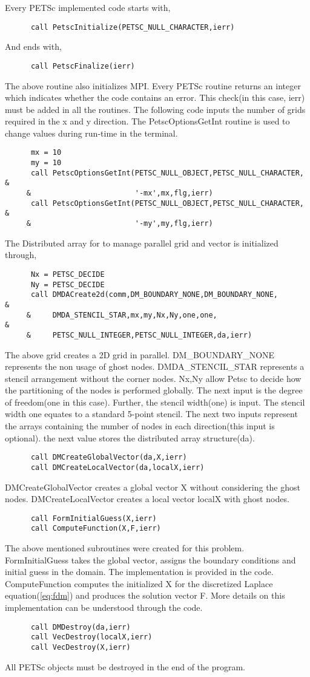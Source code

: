 Every PETSc implemented code starts with,
\begin{lstlisting}
      call PetscInitialize(PETSC_NULL_CHARACTER,ierr)
\end{lstlisting}
And ends with,
\begin{lstlisting}
      call PetscFinalize(ierr)
\end{lstlisting}
The above routine also initializes MPI. Every PETSc routine returns an integer which indicates whether the code contains an error. This check(in this case, ierr) must be added in all the routines. 
\newpage
The following code inputs the number of grids required in the x and y direction. The PetscOptionsGetInt routine is used to change values during run-time in the terminal. 
\begin{lstlisting}
      mx = 10
      my = 10
      call PetscOptionsGetInt(PETSC_NULL_OBJECT,PETSC_NULL_CHARACTER,    &
     &                        '-mx',mx,flg,ierr)
      call PetscOptionsGetInt(PETSC_NULL_OBJECT,PETSC_NULL_CHARACTER,    &
     &                        '-my',my,flg,ierr)
\end{lstlisting}
The Distributed array for to manage parallel grid and vector is initialized through,
\begin{lstlisting}
      Nx = PETSC_DECIDE
      Ny = PETSC_DECIDE
      call DMDACreate2d(comm,DM_BOUNDARY_NONE,DM_BOUNDARY_NONE,         &
     &     DMDA_STENCIL_STAR,mx,my,Nx,Ny,one,one,                        &
     &     PETSC_NULL_INTEGER,PETSC_NULL_INTEGER,da,ierr)
\end{lstlisting}
The above grid creates a 2D grid in parallel. DM\_BOUNDARY\_NONE represents the non usage of ghost nodes. DMDA\_STENCIL\_STAR represents a stencil arrangement without the corner nodes. Nx,Ny allow Petsc to decide how the partitioning of the nodes is performed globally. The next input is the degree of freedom(one in this case). Further, the stencil width(one) is input. The stencil width one equates to a standard 5-point stencil. The next two inputs represent the arrays containing the number of nodes in each direction(this input is optional). the next value stores the distributed array structure(da).
\begin{lstlisting}
      call DMCreateGlobalVector(da,X,ierr)
      call DMCreateLocalVector(da,localX,ierr)
\end{lstlisting}
DMCreateGlobalVector creates a global vector X without considering the ghost nodes. DMCreateLocalVector creates a local vector localX with ghost nodes.
\begin{lstlisting}
      call FormInitialGuess(X,ierr)
      call ComputeFunction(X,F,ierr)
\end{lstlisting}
The above mentioned subroutines were created for this problem. FormInitialGuess takes the global vector, assigns the boundary conditions and initial guess in the domain. The implementation is provided in the code. ComputeFunction computes the initialized X for the discretized Laplace equation(\ref{eq:fdm}) and produces the solution vector F. More details on this implementation can be understood through the code. 

\begin{lstlisting}
      call DMDestroy(da,ierr)
      call VecDestroy(localX,ierr)
      call VecDestroy(X,ierr)
\end{lstlisting}
All PETSc objects must be destroyed in the end of the program. 



